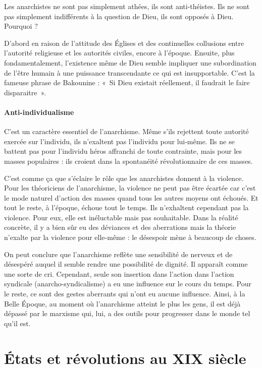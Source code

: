 \documentclass[12pt]{report}
\begin{document}
Les anarchistes ne sont pas simplement athées, ils sont anti-théistes. Ils ne sont pas simplement indifférents à la question de Dieu, ils sont opposés à Dieu.
Pourquoi ?

D’abord en raison de l’attitude des Églises et des continuelles collusions entre l’autorité religieuse et les autorités civiles, encore à l'époque.
Ensuite, plus fondamentalement, l’existence même de Dieu semble impliquer une subordination de l’être humain à une puissance transcendante ce qui est insupportable.
C'est la fameuse phrase de Bakounine : «~Si Dieu existait réellement, il faudrait le faire disparaitre~».

\subsubsection{Anti-individualisme}

C’est un caractère essentiel de l’anarchisme. 
Même s’ils rejettent toute autorité exercée sur l’individu, ils n’exaltent pas l’individu pour lui-même. 
Ils ne se battent pas pour l’individu héros affranchi de toute contrainte, mais pour les masses populaires : ils croient dans la spontanéité révolutionnaire de ces masses. 

C'est comme ça que s'éclaire le rôle que les anarchistes donnent à la violence.
Pour les théoriciens de l’anarchisme, la violence ne peut pas être écartée car c'est le mode naturel d’action des masses quand tous les autres moyens ont échoués.
Et tout le reste, à l’époque, échoue tout le temps.
Ils n'exhaltent cependant pas la violence.
Pour eux, elle est inéluctable mais pas souhaitable.
Dans la réalité concrète, il y a bien sûr eu des déviances et des aberrations mais la théorie n’exalte par la violence pour elle-même : le désespoir mène à beaucoup de choses.

On peut conclure que l’anarchisme reflète une sensibilité de nerveux et de désespéré auquel il semble rendre une possibilité de dignité.
Il apparaît comme une sorte de cri.
Cependant, seule son insertion dans l'action dans l'action syndicale (anarcho-syndicalisme) a eu une influence sur le cours du temps.
Pour le reste, ce sont des gestes aberrants qui n'ont eu aucune influence.
Ainsi, à la Belle Époque, au moment où l’anarchisme atteint le plus les gens, il est déjà dépassé par le marxisme qui, lui, a des outils pour progresser dans le monde tel qu'il est.

\chapter{États et révolutions au XIX siècle}
\end{document}
